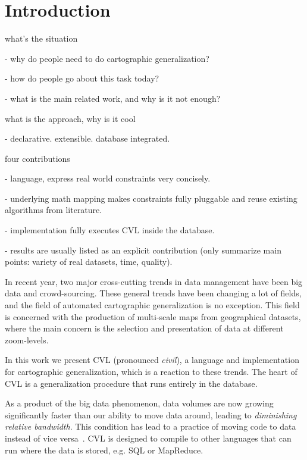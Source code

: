 \section{Introduction}


what's the situation

- why do people need to do cartographic generalization?

- how do people go about this task today?

- what is the main related work, and why is it not enough?

what is the approach, why is it cool

- declarative. extensible. database integrated.

four contributions

- language, express real world constraints very concisely.

- underlying math mapping makes constraints fully pluggable and reuse existing algorithms from literature.

- implementation fully executes CVL inside the database.

- results are usually listed as an explicit contribution (only summarize main points: variety of real datasets, time, quality).


In recent year, two major cross-cutting trends in data management have been  big data and crowd-sourcing. These general trends have been changing a lot of fields, and the field of automated cartographic generalization is no exception. This field is concerned with the production of multi-scale maps from geographical datasets, where the main concern is the selection and presentation of data at different zoom-levels.

In this work we present CVL (pronounced \emph{civil}), a language and implementation for cartographic generalization, which is a reaction to these trends. The heart of CVL is a generalization procedure that runs entirely in the database.

As a product of the big data phenomenon, data volumes are now growing significantly faster than our ability to move data around, leading to \emph{diminishing relative bandwidth}. This condition has lead to a practice of moving code to data~\cite{mapreduce} instead of vice versa~\cite{fusiontables}. CVL is designed to compile to other languages that can run where the data is stored, e.g. SQL or MapReduce.

